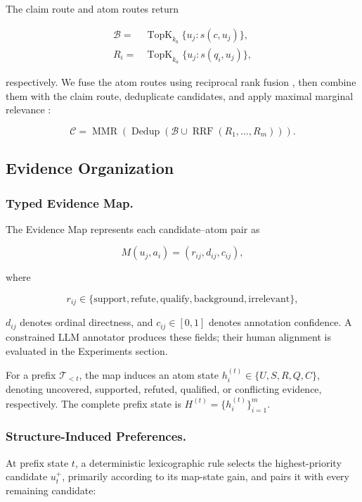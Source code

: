 \documentclass[letterpaper]{article}
\begin{document}
The claim route and atom routes return

\[
\begin{aligned}
\mathcal B =& \operatorname{TopK}_{k_b}\{u_j:s(c,u_j)\},\\
R_i =& \operatorname{TopK}_{k_a}\{u_j:s(q_i,u_j)\},
\end{aligned}
\]

respectively. We fuse the atom routes using reciprocal rank fusion
\citep{Cormack2009RRF}, then combine them with the claim route,
deduplicate candidates, and apply maximal marginal relevance
\citep{Goldstein1998MMR}:

\[
\mathcal C=
\operatorname{MMR}\!\left(
\operatorname{Dedup}\!\left(
\mathcal B\cup
\operatorname{RRF}(R_1,\ldots,R_m)
\right)\right).
\]
\subsection{Evidence Organization}

\subsubsection{Typed Evidence Map.}

The Evidence Map represents each candidate--atom pair as

\[
M(u_j,a_i)=(r_{ij},d_{ij},c_{ij}),
\]

where

\[
r_{ij}\in\{
\text{support},\text{refute},\text{qualify},
\text{background},\text{irrelevant}
\},
\]

$d_{ij}$ denotes ordinal directness, and $c_{ij}\in[0,1]$ denotes
annotation confidence. A constrained LLM annotator produces these
fields; their human alignment is evaluated in the Experiments section.

For a prefix $\mathcal T_{<t}$, the map induces an atom state
$h_i^{(t)}\in\{U,S,R,Q,C\}$, denoting uncovered, supported, refuted,
qualified, or conflicting evidence, respectively. The complete prefix
state is $H^{(t)}=\{h_i^{(t)}\}_{i=1}^{m}$.

\subsubsection{Structure-Induced Preferences.}

At prefix state $t$, a deterministic lexicographic rule selects the
highest-priority candidate $u_t^+$, primarily according to its
map-state gain, and pairs it with every remaining candidate:
\end{document}
